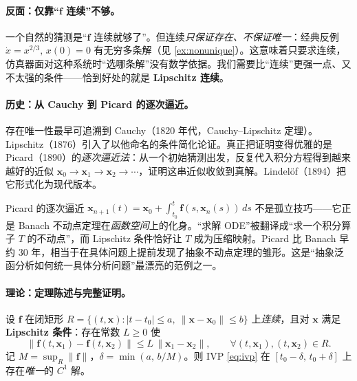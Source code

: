 \paragraph{反面：仅靠“$\mathbf{f}$ 连续”不够。}
一个自然的猜测是“$\mathbf{f}$ 连续就够了”。但连续\emph{只保证存在、不保证唯一}：经典反例 $\dot x=x^{2/3},\,x(0)=0$ 有无穷多条解（见 \cref{ex:nonunique}）。这意味着只要求连续，仿真器面对这种系统时“选哪条解”没有数学依据。我们需要比“连续”更强一点、又不太强的条件——恰到好处的就是 \textbf{Lipschitz 连续}。

\paragraph{历史：从 Cauchy 到 Picard 的逐次逼近。}
存在唯一性最早可追溯到 Cauchy（1820 年代，Cauchy--Lipschitz 定理）。Lipschitz（1876）引入了以他命名的条件简化论证。真正把证明变得优雅的是 Picard（1890）的\emph{逐次逼近法}：从一个初始猜测出发，反复代入积分方程得到越来越好的近似 $\mathbf{x}_0\to\mathbf{x}_1\to\mathbf{x}_2\to\cdots$，证明这串近似收敛到真解。Lindelöf（1894）把它形式化为现代版本。

\begin{insight}[Picard 逐次逼近 $=$ Banach 不动点定理在函数空间上的化身]
Picard 的逐次逼近 $\mathbf{x}_{n+1}(t)=\mathbf{x}_0+\int_{t_0}^t\mathbf{f}(s,\mathbf{x}_n(s))\,ds$ 不是孤立技巧——它正是 Banach 不动点定理在\emph{函数空间}上的化身。“求解 ODE”被翻译成“求一个积分算子 $T$ 的不动点”，而 Lipschitz 条件恰好让 $T$ 成为压缩映射。Picard 比 Banach 早约 30 年，相当于在具体问题上提前发现了抽象不动点定理的雏形。这是“抽象泛函分析如何统一具体分析问题”最漂亮的范例之一。
\end{insight}

\paragraph{理论：定理陈述与完整证明。}

\begin{theorem}\label{thm:picard}
设 $\mathbf{f}$ 在闭矩形 $R=\{(t,\mathbf{x}):|t-t_0|\le a,\ \|\mathbf{x}-\mathbf{x}_0\|\le b\}$ 上\emph{连续}，且对 $\mathbf{x}$ 满足 \textbf{Lipschitz 条件}：存在常数 $L\ge0$ 使
\begin{equation}
  \|\mathbf{f}(t,\mathbf{x}_1)-\mathbf{f}(t,\mathbf{x}_2)\|\le L\,\|\mathbf{x}_1-\mathbf{x}_2\|,\qquad\forall (t,\mathbf{x}_1),(t,\mathbf{x}_2)\in R.
  \label{eq:lipschitz}
\end{equation}
记 $M=\sup_R\|\mathbf{f}\|$，$\delta=\min(a,\,b/M)$。则 IVP \cref{eq:ivp} 在 $[t_0-\delta,\,t_0+\delta]$ 上存在\emph{唯一}的 $C^1$ 解。
\end{theorem}

